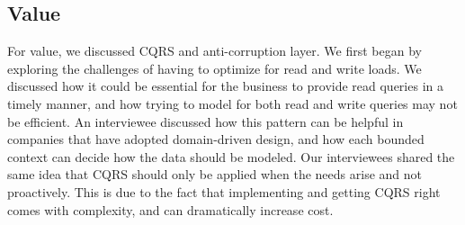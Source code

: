 \documentclass[a4paper,11pt,article,oneside]{memoir}
\begin{document}



\subsection{Value}

For value, we discussed CQRS and anti-corruption layer. We first began by exploring the challenges of having to optimize for read and write loads. We discussed how it could be essential for the business to provide read queries in a timely manner, and how trying to model for both read and write queries may not be efficient. An interviewee discussed how this pattern can be helpful in companies that have adopted domain-driven design, and how each bounded context can decide how the data should be modeled. Our interviewees shared the same idea that CQRS should only be applied when the needs arise and not proactively. This is due to the fact that implementing and getting CQRS right comes with complexity, and can dramatically increase cost.




\end{document}
